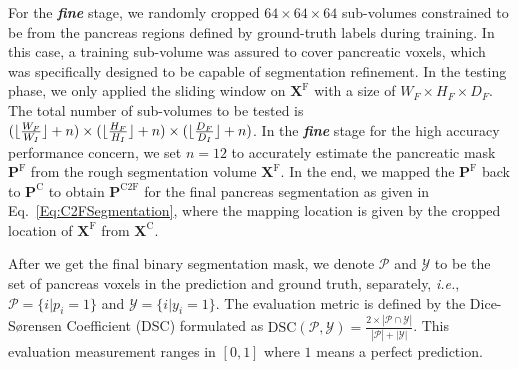 \documentclass[10pt,twocolumn,letterpaper]{article}
\DeclarePairedDelimiter\floor{\lfloor}{\rfloor}
\begin{document}
For the \textit{\textbf{fine}} stage, we randomly cropped $64 \times 64 \times 64$ sub-volumes constrained to be from the pancreas regions defined by ground-truth labels during training. In this case, a training sub-volume was assured to cover pancreatic voxels, which was specifically designed to be capable of segmentation refinement. In the testing phase, we only applied the sliding window on $\mathbf{X}^\textrm{F}$ with a size of $W_F\times H_F\times D_F$. The total number of sub-volumes to be tested is $(\floor{\frac{W_F}{W_I}} + n)\times (\floor{\frac{H_F}{H_I}} + n)\times (\floor{\frac{D_F}{D_I}} + n)$. In the \textit{\textbf{fine}} stage for the high accuracy performance concern, we set $n = 12$ to accurately estimate the pancreatic mask $\mathbf{P}^\textrm{F}$ from the rough segmentation volume $\mathbf{X}^\textrm{F}$. In the end, we mapped the $\mathbf{P}^\textrm{F}$ back to $\mathbf{P}^\textrm{C}$ to obtain $\mathbf{P}^\textrm{C2F}$ for the final pancreas segmentation as given in Eq.~\ref{Eq:C2FSegmentation}, where the mapping location is given by the cropped location of $\mathbf{X}^\textrm{F}$ from $\mathbf{X}^\textrm{C}$.

After we get the final binary segmentation mask, we denote $\mathcal{P}$ and $\mathcal{Y}$ to be the set of pancreas voxels in the prediction and ground truth, separately, \emph{i.e.}, $\mathcal{P} = \{i | p_i = 1\}$ and $\mathcal{Y} = \{i | y_i = 1\}$. The evaluation metric is defined by the Dice-S{\o}rensen Coefficient (DSC) formulated as $\text{DSC}(\mathcal{P}, \mathcal{Y}) = \frac{2\times |\mathcal{P}\cap \mathcal{Y}|}{|\mathcal{P}| + |\mathcal{Y}|}$. This evaluation measurement ranges in $[0, 1]$ where $1$ means a perfect prediction.
\end{document}
